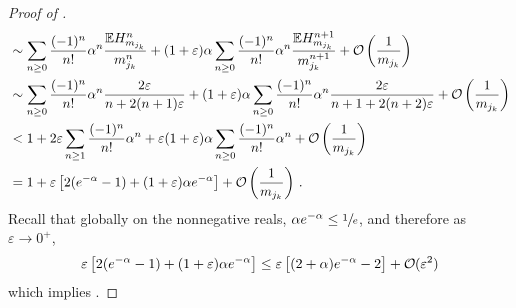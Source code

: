 \documentclass[11pt, a4paper, twoside]{article}
\DeclareRobustCommand{\bigO}{\text{\usefont{OMS}{cmsy}{m}{n}O}}
\newcommand{\eps}{\varepsilon}
\newcommand{\EE}{\mathbb{E}}
\numberwithin{equation}{section}
\begin{document}
\begin{proof}[Proof of ]
\begin{align*}
                    &\sim \sum_{n\ge0}\frac{(-1)^n}{n!}\alpha^n\frac{\EE H_{m_{j_k}}^n}{m_{j_k}^n}+(1+\eps)\alpha\sum_{n\ge0}\frac{(-1)^n}{n!}\alpha^n\frac{\EE H_{m_{j_k}}^{n+1}}{m_{j_k}^{n+1}}+\bigO\left(\frac{1}{m_{j_k}}\right)\\
                    &\sim  \sum_{n\ge0}\frac{(-1)^n}{n!}\alpha^n\frac{2\eps}{n+2(n+1)\eps}+(1+\eps)\alpha\sum_{n\ge0}\frac{(-1)^n}{n!}\alpha^n\frac{2\eps}{n+1+2(n+2)\eps}+\bigO\left(\frac{1}{m_{j_k}}\right)\\
                    &< 1 + 2\eps\sum_{n\ge1}\frac{(-1)^n}{n!}\alpha^n+\eps(1+\eps)\alpha\sum_{n\ge0}\frac{(-1)^n}{n!}\alpha^n+\bigO\left(\frac{1}{m_{j_k}}\right)\\
                    &=1 + \eps\left[2(e^{-\alpha}-1)+(1+\eps)\alpha e^{-\alpha}\right] + \bigO\left(\frac{1}{m_{j_k}}\right) \,.
    		\end{align*}
    		Recall that globally on the nonnegative reals, $\alpha e^{-\alpha}\le\sfrac{1}{e}$, and therefore as $\eps\longrightarrow 0^+$,
    		\[
                \eps\left[2(e^{-\alpha}-1)+(1+\eps)\alpha e^{-\alpha}\right] 
                    \le \eps\left[(2+\alpha)e^{-\alpha}-2\right]+\bigO(\eps^2) 
            \]
    		which implies .
    \end{proof}
    
\end{document}
